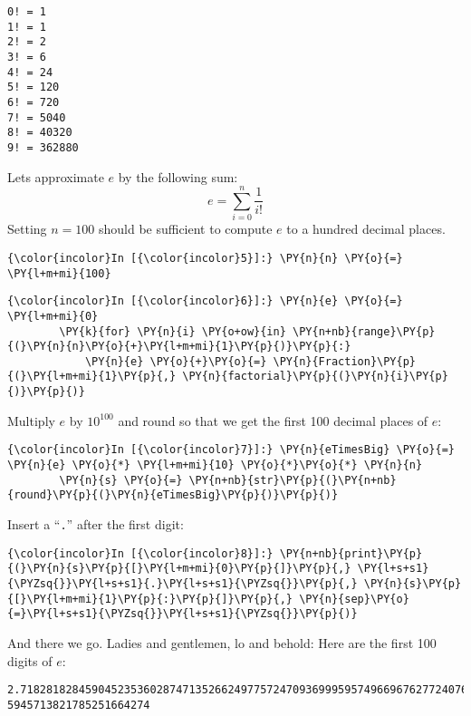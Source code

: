 \begin{Verbatim}[commandchars=\\\{\}]
0! = 1
1! = 1
2! = 2
3! = 6
4! = 24
5! = 120
6! = 720
7! = 5040
8! = 40320
9! = 362880
\end{Verbatim}
Lets approximate \(e\) by the following sum:
\[ e = \sum\limits_{i=0}^n \frac{1}{i!} \] Setting \(n=100\) should be
sufficient to compute \(e\) to a hundred decimal places.

\begin{Verbatim}[commandchars=\\\{\}]
{\color{incolor}In [{\color{incolor}5}]:} \PY{n}{n} \PY{o}{=} \PY{l+m+mi}{100}
\end{Verbatim}

\begin{Verbatim}[commandchars=\\\{\}]
{\color{incolor}In [{\color{incolor}6}]:} \PY{n}{e} \PY{o}{=} \PY{l+m+mi}{0}
        \PY{k}{for} \PY{n}{i} \PY{o+ow}{in} \PY{n+nb}{range}\PY{p}{(}\PY{n}{n}\PY{o}{+}\PY{l+m+mi}{1}\PY{p}{)}\PY{p}{:}
            \PY{n}{e} \PY{o}{+}\PY{o}{=} \PY{n}{Fraction}\PY{p}{(}\PY{l+m+mi}{1}\PY{p}{,} \PY{n}{factorial}\PY{p}{(}\PY{n}{i}\PY{p}{)}\PY{p}{)}
\end{Verbatim}
Multiply \(e\) by \(10^{100}\) and round so that we get the first 100
decimal places of \(e\):

\begin{Verbatim}[commandchars=\\\{\}]
{\color{incolor}In [{\color{incolor}7}]:} \PY{n}{eTimesBig} \PY{o}{=} \PY{n}{e} \PY{o}{*} \PY{l+m+mi}{10} \PY{o}{*}\PY{o}{*} \PY{n}{n}
        \PY{n}{s} \PY{o}{=} \PY{n+nb}{str}\PY{p}{(}\PY{n+nb}{round}\PY{p}{(}\PY{n}{eTimesBig}\PY{p}{)}\PY{p}{)}
\end{Verbatim}
Insert a ``\texttt{.}'' after the first digit:
\begin{Verbatim}[commandchars=\\\{\}]
{\color{incolor}In [{\color{incolor}8}]:} \PY{n+nb}{print}\PY{p}{(}\PY{n}{s}\PY{p}{[}\PY{l+m+mi}{0}\PY{p}{]}\PY{p}{,} \PY{l+s+s1}{\PYZsq{}}\PY{l+s+s1}{.}\PY{l+s+s1}{\PYZsq{}}\PY{p}{,} \PY{n}{s}\PY{p}{[}\PY{l+m+mi}{1}\PY{p}{:}\PY{p}{]}\PY{p}{,} \PY{n}{sep}\PY{o}{=}\PY{l+s+s1}{\PYZsq{}}\PY{l+s+s1}{\PYZsq{}}\PY{p}{)}
\end{Verbatim}
And there we go. Ladies and gentlemen, lo and behold: Here are the first 100 digits of $e$:
\begin{Verbatim}[commandchars=\\\{\}]
2.718281828459045235360287471352662497757247093699959574966967627724076630353547
5945713821785251664274
\end{Verbatim}


